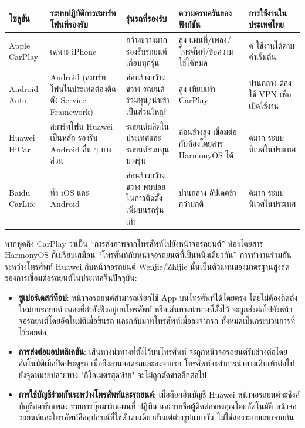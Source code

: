 \begin{center}
\begin{tabularx}{\linewidth}{|X|X|X|X|X|}
\hline
\textbf{โซลูชัน} & \textbf{ระบบปฏิบัติการสมาร์ทโฟนที่รองรับ} & \textbf{รุ่นรถที่รองรับ} & \textbf{ความครบครันของฟังก์ชัน} & \textbf{การใช้งานในประเทศไทย} \tabularnewline
\hline
Apple CarPlay & เฉพาะ iPhone & กว้างขวางมาก รองรับรถยนต์เกือบทุกรุ่น & สูง แผนที่/เพลง/โทรศัพท์/ข้อความ ใช้ได้หมด & ดี ใช้งานได้ตามค่าเริ่มต้น \tabularnewline
Android Auto & Android (สมาร์ทโฟนในประเทศต้องติดตั้ง Service Framework) & ค่อนข้างกว้างขวาง รถยนต์ร่วมทุน/นำเข้าเป็นส่วนใหญ่ & สูง เทียบเท่า CarPlay & ปานกลาง ต้องใช้ VPN เพื่อเปิดใช้งาน \tabularnewline
Huawei HiCar & สมาร์ทโฟน Huawei เป็นหลัก รองรับ Android อื่น ๆ บางส่วน & รถยนต์ผลิตในประเทศและรถยนต์ร่วมทุนบางรุ่น & ค่อนข้างสูง เชื่อมต่อกับห้องโดยสาร HarmonyOS ได้ & ดีมาก ระบบนิเวศในประเทศ \tabularnewline
Baidu CarLife & ทั้ง iOS และ Android & ค่อนข้างกว้างขวาง พบบ่อยในการติดตั้งเพิ่มบนรถรุ่นเก่า & ปานกลาง อัปเดตช้ากว่าปกติ & ดีมาก ระบบนิเวศในประเทศ \tabularnewline
\hline
\end{tabularx}
\end{center}


หากพูดถึง CarPlay ว่าเป็น “การส่งภาพจากโทรศัพท์ไปยังหน้าจอรถยนต์” ห้องโดยสาร HarmonyOS ก็เปรียบเสมือน “โทรศัพท์กับหน้าจอรถยนต์ที่เป็นหนึ่งเดียวกัน” การทำงานร่วมกันระหว่างโทรศัพท์ Huawei กับหน้าจอรถยนต์ Wenjie/Zhijie นั้นเป็นตัวแทนของมาตรฐานสูงสุดของการเชื่อมต่อรถยนต์ในประเทศจีนปัจจุบัน:

\begin{itemize}
  \item \textbf{ซูเปอร์เดสก์ท็อป}: หน้าจอรถยนต์สามารถเรียกใช้ App บนโทรศัพท์ได้โดยตรง โดยไม่ต้องติดตั้งใหม่บนรถยนต์ เพลงที่กำลังฟังอยู่บนโทรศัพท์ หรือเส้นทางนำทางที่ตั้งไว้ จะถูกส่งต่อไปยังหน้าจอรถยนต์โดยอัตโนมัติเมื่อขึ้นรถ และกลับมาที่โทรศัพท์เมื่อลงจากรถ ทั้งหมดเป็นกระบวนการที่ไร้รอยต่อ
  \item \textbf{การส่งต่อแอปพลิเคชัน}: เส้นทางนำทางที่ตั้งไว้บนโทรศัพท์ จะถูกหน้าจอรถยนต์รับช่วงต่อโดยอัตโนมัติเมื่อปิดประตูรถ เมื่อถึงลานจอดรถและลงจากรถ โทรศัพท์จะทำการนำทางเดินเท้าต่อไปยังจุดหมายปลายทาง "กิโลเมตรสุดท้าย" จะไม่ถูกตัดขาดอีกต่อไป
  \item \textbf{การใช้บัญชีร่วมกันระหว่างโทรศัพท์และรถยนต์}: เมื่อล็อกอินบัญชี Huawei หน้าจอรถยนต์จะซิงค์บัญชีสมาชิกเพลง รายการบุ๊คมาร์กแผนที่ ปฏิทิน และรายชื่อผู้ติดต่อของคุณโดยอัตโนมัติ หน้าจอรถยนต์และโทรศัพท์คืออุปกรณ์ที่ใช้ตัวตนเดียวกันแต่ต่างรูปแบบกัน ไม่ใช่สองระบบแยกจากกัน
\end{itemize}

